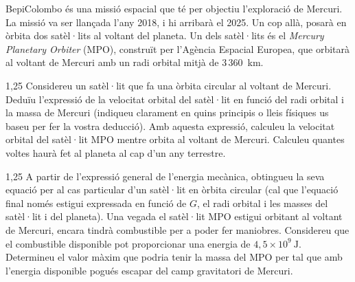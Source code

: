 BepiColombo és una missió espacial que té per objectiu l'exploració de Mercuri. La missió va ser llançada l'any 2018, i hi arribarà el 2025. Un cop allà, posarà en òrbita dos satèl·lits al voltant del planeta. Un dels satèl·lits és el \textit{Mercury Planetary Orbiter} (MPO), construït per l'Agència Espacial Europea, que orbitarà al voltant de Mercuri amb un radi orbital mitjà de 3\,360~km.

\begin{apartat}{1,25}
Considereu un satèl·lit que fa una òrbita circular al voltant de Mercuri. Deduïu l'expressió de la velocitat orbital del satèl·lit en funció del radi orbital i la massa de Mercuri (indiqueu clarament en quins principis o lleis físiques us baseu per fer la vostra deducció). Amb aquesta expressió, calculeu la velocitat orbital del satèl·lit MPO mentre orbita al voltant de Mercuri. Calculeu quantes voltes haurà fet al planeta al cap d'un any terrestre.
\end{apartat}

\begin{apartat}{1,25}
A partir de l'expressió general de l'energia mecànica, obtingueu la seva equació per al cas particular d'un satèl·lit en òrbita circular (cal que l'equació final només estigui expressada en funció de $G$, el radi orbital i les masses del satèl·lit i del planeta). Una vegada el satèl·lit MPO estigui orbitant al voltant de Mercuri, encara tindrà combustible per a poder fer maniobres. Considereu que el combustible disponible pot proporcionar una energia de $4,5\times 10^{9}\ \mathrm{J}$. Determineu el valor màxim que podria tenir la massa del MPO per tal que amb l'energia disponible pogués escapar del camp gravitatori de Mercuri.
\end{apartat}

